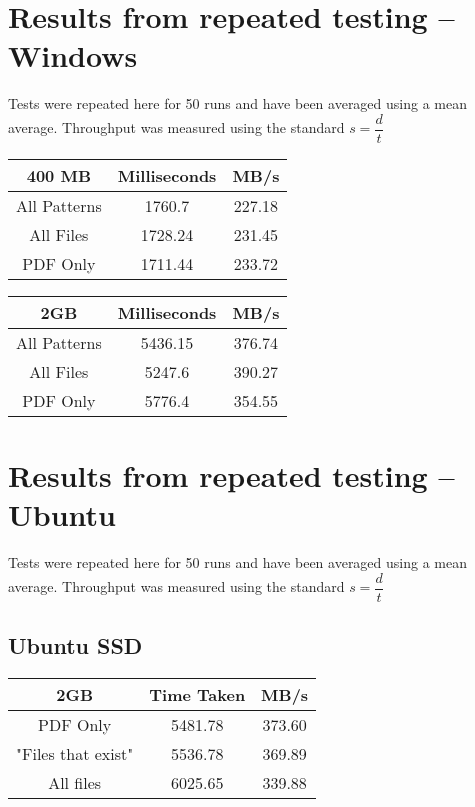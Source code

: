 \section{Results from repeated testing -- Windows}
\label{sec:WindowsTesting}
Tests were repeated here for 50 runs and have been averaged using a mean average.
Throughput was measured using the standard $s = \dfrac{d}{t}$

{\centering
\begin{tabular}{c | c | c}
400 MB & Milliseconds & MB/s \\
\hline
All Patterns & 1760.7 & 227.18 \\
All Files & 1728.24 & 231.45 \\
PDF Only & 1711.44 & 233.72 \\
\end{tabular}
\label{tab:WindowsTestingSumm400MB}
\par}

{\centering
\begin{tabular}{ c | c | c }
2GB & Milliseconds & MB/s \\
\hline
All Patterns & 5436.15 & 376.74 \\
All Files & 5247.6 & 390.27 \\
PDF Only & 5776.4 & 354.55 \\
\end{tabular}

\label{tab:WindowsTestingSumm2GB}
\par}

\newpage
\section{Results from repeated testing -- Ubuntu}
\label{sec:linuxTesting}
Tests were repeated here for 50 runs and have been averaged using a mean average.
Throughput was measured using the standard $s = \dfrac{d}{t}$

\subsection{Ubuntu SSD}
{\centering
\begin{tabular}{ c | c | c }
2GB & Time Taken & MB/s \\
\hline
PDF Only & 5481.78 & 373.60 \\
"Files that exist" & 5536.78 & 369.89 \\
All files & 6025.65 & 339.88 \\
\end{tabular}
\label{tab:UbuntuTestingSumm2GBSSD}
\par}

